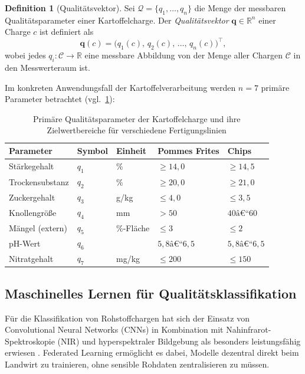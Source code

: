 \documentclass[a4paper, 12pt, twoside, openright]{report}
\theoremstyle{definition}
\newtheorem{definition}[theorem]{Definition}
\theoremstyle{definition}
\begin{document}
\begin{definition}[Qualitätsvektor]
	Sei $\mathcal{Q} = \{q_1, \ldots, q_n\}$ die Menge der messbaren
	Qualitätsparameter einer Kartoffelcharge. Der \emph{Qualitätsvektor}
	$\mathbf{q} \in \mathbb{R}^n$ einer Charge $c$ ist definiert als
	\[
	\mathbf{q}(c) = \bigl(q_1(c),\, q_2(c),\, \ldots,\, q_n(c)\bigr)^{\!\top},
	\]
	wobei jedes $q_i : \mathcal{C} \to \mathbb{R}$ eine messbare Abbildung
	von der Menge aller Chargen $\mathcal{C}$ in den Messwerteraum ist.
\end{definition}

Im konkreten Anwendungsfall der Kartoffelverarbeitung werden $n = 7$
primäre Parameter betrachtet (vgl.~\cref{tab:qualitaetsparameter}):

\begin{table}[H]
	\centering
	\caption{Primäre Qualitätsparameter der Kartoffelcharge und ihre
		Zielwertbereiche für verschiedene Fertigungslinien}
	\label{tab:qualitaetsparameter}
	\begin{tabular}{@{}lllll@{}}
		\toprule
		\textbf{Parameter} & \textbf{Symbol} & \textbf{Einheit} &
		\textbf{Pommes Frites} & \textbf{Chips} \\
		\midrule
		Stärkegehalt        & $q_1$ & $\%$       & $\geq 14{,}0$ & $\geq 14{,}5$ \\
		Trockensubstanz     & $q_2$ & $\%$       & $\geq 20{,}0$ & $\geq 21{,}0$ \\
		Zuckergehalt        & $q_3$ & g/kg       & $\leq 4{,}0$  & $\leq 3{,}5$ \\
		Knollengröße        & $q_4$ & mm         & $> 50$        & $40\text{â€“}60$ \\
		Mängel (extern)     & $q_5$ & $\%$-Fläche& $\leq 3$      & $\leq 2$ \\
		pH-Wert             & $q_6$ &          & $5{,}8\text{â€“}6{,}5$ & $5{,}8\text{â€“}6{,}5$ \\
		Nitratgehalt        & $q_7$ & mg/kg      & $\leq 200$    & $\leq 150$ \\
		\bottomrule
	\end{tabular}
\end{table}

\subsection{Maschinelles Lernen für Qualitätsklassifikation}

Für die Klassifikation von Rohstoffchargen hat sich der Einsatz von
Convolutional Neural Networks (CNNs) in Kombination mit Nahinfrarot-Spektroskopie
(NIR) und hyperspektraler Bildgebung als besonders leistungsfähig erwiesen
\cite{elmasry2012,su2017,lu2020}. Federated Learning \cite{mcmahan2017}
ermöglicht es dabei, Modelle dezentral direkt beim Landwirt zu trainieren,
ohne sensible Rohdaten zentralisieren zu müssen.
\end{document}
